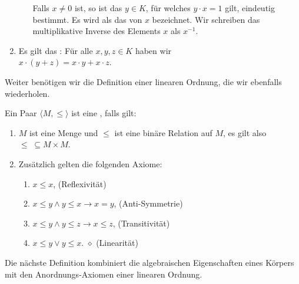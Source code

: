 \begin{Definition}[Körper]
\begin{enumerate}
\begin{enumerate}
            Falls $x \not= 0$ ist, so ist das $y \in K$, für welches $y \cdot x = 1$ gilt, eindeutig
            bestimmt.  Es wird als das  von $x$   
            bezeichnet.  Wir schreiben das multiplikative Inverse des Elements $x$ als $x^{-1}$. 
            
      \end{enumerate}
\item Es gilt das : Für alle $x, y,z \in K$ haben wir
      \\[0.2cm]
      \hspace*{1.3cm} 
      $x \cdot (y + z) = x \cdot y + x \cdot z$.  \edx
\end{enumerate}
\end{Definition}

\noindent
Weiter benötigen wir die Definition einer linearen Ordnung, die wir ebenfalls wiederholen.

\begin{Definition}
  Ein Paar $\langle M, \leq \rangle$ ist eine , falls gilt:
  \begin{enumerate}
  \item $M$ ist eine Menge und $\leq$ ist eine binäre Relation auf $M$, es gilt also
        \\[0.2cm]
        \hspace*{1.3cm}
        $\leq\; \subseteq M \times M$.
  \item Zusätzlich gelten die folgenden Axiome:
        \begin{enumerate}
        \item $x \leq x$,                 \hspace*{\fill} (Reflexivität)
        \item $x \leq y \wedge y \leq x \rightarrow x = y$,  \hspace*{\fill} (Anti-Symmetrie)
        \item $x \leq y \wedge y \leq z \rightarrow x \leq z$,  \hspace*{\fill} (Transitivität)
        \item $x \leq y \vee y \leq x$. \quad  $\diamond$   \hspace*{\fill} (Linearität)
        \end{enumerate}
  \end{enumerate} 
\end{Definition} 

Die nächste Definition kombiniert die algebraischen Eigenschaften eines Körpers mit den
Anordnungs-Axiomen einer linearen Ordnung.

